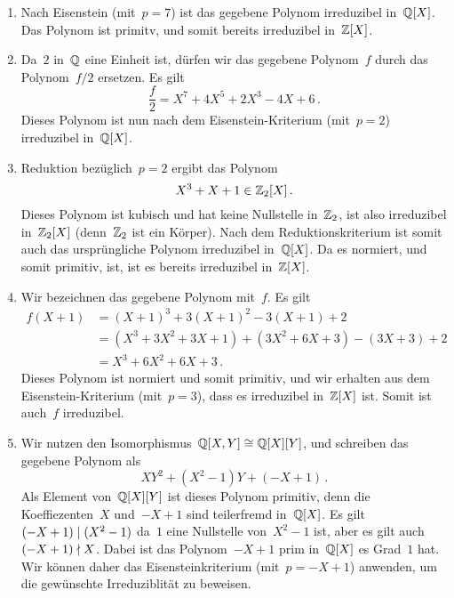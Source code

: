 \documentclass{scrartcl}
\begin{document}
\begin{solution}
  \begin{enumerate}
    \item
      Nach Eisenstein (mit~$p = 7$) ist das gegebene Polynom irreduzibel in~$\mathbb{Q}[X]$.
      Das Polynom ist primitv, und somit bereits irreduzibel in~$\mathbb{Z}[X]$.
    \item
      Da~$2$ in~$\mathbb{Q}$ eine Einheit ist, dürfen wir das gegebene Polynom~$f$ durch das Polynom~$f/2$ ersetzen.
      Es gilt
      \[
        \frac{f}{2}
        =
        X^7 + 4 X^5 + 2 X^3 - 4 X + 6 \,.
      \]
      Dieses Polynom ist nun nach dem Eisenstein-Kriterium (mit~$p = 2$) irreduzibel in~$\mathbb{Q}[X]$.
    \item
     Reduktion bezüglich~$p = 2$ ergibt das Polynom
     \[
       X^3 + X + 1 \in \mathbb{Z}_2[X] \,.
     \]
     Dieses Polynom ist kubisch und hat keine Nullstelle in~$\mathbb{Z}_2$, ist also irreduzibel in~$\mathbb{Z}_2[X]$ (denn~$\mathbb{Z}_2$ ist ein Körper).
     Nach dem Reduktionskriterium ist somit auch das ursprüngliche Polynom irreduzibel in~$\mathbb{Q}[X]$.
     Da es normiert, und somit primitiv, ist, ist es bereits irreduzibel in~$\mathbb{Z}[X]$.
   \item
     Wir bezeichnen das gegebene Polynom mit~$f$.
     Es gilt
     \begin{align*}
       f(X + 1)
       &=
       (X+1)^3 + 3 (X+1)^2 - 3 (X+1) + 2
       \\
       &=
       (X^3 + 3 X^2 + 3 X + 1) + (3 X^2 + 6 X + 3) - (3X + 3) + 2
       \\
       &=
       X^3 + 6 X^2 + 6 X + 3 \,.
     \end{align*}
     Dieses Polynom ist normiert und somit primitiv, und wir erhalten aus dem Eisenstein-\hspace{0pt}Kriterium (mit~$p = 3$), dass es irreduzibel in~$\mathbb{Z}[X]$ ist.
     Somit ist auch~$f$ irreduzibel.
   \item
     Wir nutzen den Isomorphismus~$\mathbb{Q}[X,Y] \cong \mathbb{Q}[X][Y]$, und schreiben das gegebene Polynom als
     \[
       X Y^2 + (X^2 - 1) Y + (-X + 1) \,.
     \]
     Als Element von~$\mathbb{Q}[X][Y]$ ist dieses Polynom primitiv, denn die Koeffiezenten~$X$ und~$-X+1$ sind teilerfremd in~$\mathbb{Q}[X]$.
     Es gilt~$(-X+1) \mid (X^2 - 1)$ da~$1$ eine Nullstelle von~$X^2 - 1$ ist, aber es gilt auch~$(-X+1) \nmid X$.
     Dabei ist das Polynom~$-X+1$ prim in~$\mathbb{Q}[X]$ es Grad~$1$ hat.
     Wir können daher das Eisensteinkriterium (mit~$p = -X+1$) anwenden, um die gewünschte Irreduziblität zu beweisen.
  \end{enumerate}
\end{solution}
\end{document}
